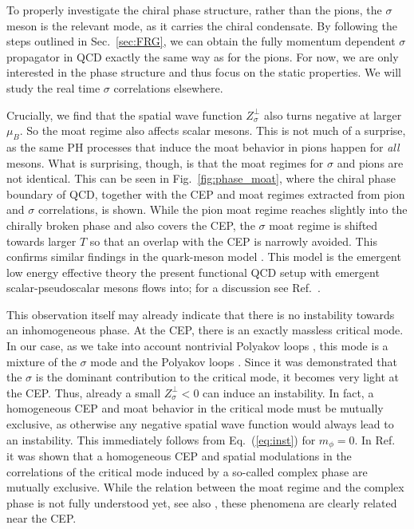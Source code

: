 \documentclass[reprint,english,superscriptaddress,preprintnumbers,amsmath,amssymb,aps,prd,nofootinbib]{revtex4-2}
\def\Eq#1{Eq.~(\ref{#1})}
\def\Fig#1{Fig.~\ref{#1}}
\def\Sec#1{Sec.~\ref{#1}}
\begin{document}
To properly investigate the chiral phase structure, rather than the pions, the $\sigma$ meson is the relevant mode, as it carries the chiral condensate. By following the steps outlined in \Sec{sec:FRG}, we can obtain the fully momentum dependent $\sigma$ propagator in QCD exactly the same way as for the pions. For now, we are only interested in the phase structure and thus focus on the static properties. We will study the real time $\sigma$ correlations elsewhere.

Crucially, we find that the spatial wave function $Z_\sigma^\perp$ also turns negative at larger $\mu_B$. So the moat regime also affects scalar mesons. This is not much of a surprise, as the same PH processes that induce the moat behavior in pions happen for \emph{all} mesons. What is surprising, though, is that the moat regimes for $\sigma$ and pions are not identical. This can be seen in \Fig{fig:phase_moat}, where the chiral phase boundary of QCD, together with the CEP and moat regimes extracted from pion and $\sigma$ correlations, is shown. While the pion moat regime reaches slightly into the chirally broken phase and also covers the CEP, the $\sigma$ moat regime is shifted towards larger $T$ so that an overlap with the CEP is narrowly avoided. This confirms similar findings in the quark-meson model \cite{BPT}. This model is the emergent low energy effective theory the present functional QCD setup with emergent scalar-pseudoscalar mesons flows into; for a discussion see Ref.\ \cite{Dupuis:2020fhh, Fu:2022gou}. 

This observation itself may already indicate that there is no instability towards an inhomogeneous phase. At the CEP, there is an exactly massless critical mode. In our case, as we take into account nontrivial Polyakov loops \cite{Fu:2019hdw}, this mode is a mixture of the $\sigma$ mode and the Polyakov loops \cite{Haensch:2023sig}. Since it was demonstrated that the $\sigma$ is the dominant contribution to the critical mode, it becomes very light at the CEP. Thus, already a small $Z_\sigma^\perp < 0$ can induce an instability. In fact, a homogeneous CEP and moat behavior in the critical mode must be mutually exclusive, as otherwise any negative spatial wave function would always lead to an instability. This immediately follows from \Eq{eq:inst} for $m_\phi=0$. In Ref.\ \cite{Haensch:2023sig} it was shown that a homogeneous CEP and spatial modulations in the correlations of the critical mode induced by a so-called complex phase are mutually exclusive. While the relation between the moat regime and the complex phase is not fully understood yet, see also \cite{Schindler:2021otf, Nussinov:2024erh}, these phenomena are clearly related near the CEP. 
\end{document}
